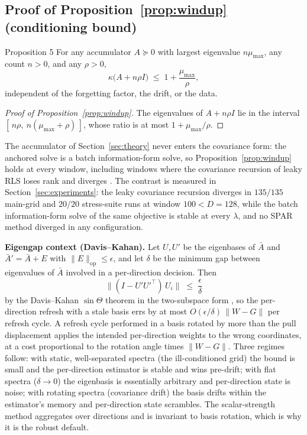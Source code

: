 \subsection{Proof of Proposition~\ref{prop:windup} (conditioning bound)}
\label{app:proof-props}

\begin{restated}{Proposition 5}
For any accumulator $A \succeq 0$ with largest eigenvalue $n\mu_{\max}$, any count $n > 0$, and any $\rho > 0$,
\[
  \kappa\bigl(A + n\rho I\bigr) \;\le\; 1 + \frac{\mu_{\max}}{\rho},
\]
independent of the forgetting factor, the drift, or the data.
\end{restated}

\begin{proof}[Proof of Proposition~\ref{prop:windup}]
The eigenvalues of $A + n\rho I$ lie in the interval $[\,n\rho,\ n(\mu_{\max} + \rho)\,]$, whose ratio is at most $1 + \mu_{\max}/\rho$.
\end{proof}

The accumulator of Section~\ref{sec:theory} never enters the covariance form: the anchored solve is a batch information-form solve, so Proposition~\ref{prop:windup} holds at every window, including windows where the covariance recursion of leaky RLS loses rank and diverges \citep{sayed2008}.
The contrast is measured in Section~\ref{sec:experiments}: the leaky covariance recursion diverges in $135/135$ main-grid and $20/20$ stress-suite runs at window $100 < D = 128$, while the batch information-form solve of the same objective is stable at every $\lambda$, and no SPAR method diverged in any configuration.

\medskip
\noindent\textbf{Eigengap context (Davis--Kahan).}
Let $U, U'$ be the eigenbases of $\bar A$ and $\bar A' = \bar A + E$ with $\|E\|_{\mathrm{op}} \le \epsilon$, and let $\delta$ be the minimum gap between eigenvalues of $\bar A$ involved in a per-direction decision.
Then
\[
  \bigl\|(I - U'U'^\top)\,U_i\bigr\| \;\le\; \frac{\epsilon}{\delta}
\]
by the Davis--Kahan $\sin\Theta$ theorem in the two-subspace form \citep{davis1970,wedin1972}, so the per-direction refresh with a stale basis errs by at most $O(\epsilon/\delta)\,\|W - G\|$ per refresh cycle.
A refresh cycle performed in a basis rotated by more than the pull displacement applies the intended per-direction weights to the wrong coordinates, at a cost proportional to the rotation angle times $\|W - G\|$.
Three regimes follow: with static, well-separated spectra (the ill-conditioned grid) the bound is small and the per-direction estimator is stable and wins pre-drift; with flat spectra ($\delta \to 0$) the eigenbasis is essentially arbitrary and per-direction state is noise; with rotating spectra (covariance drift) the basis drifts within the estimator's memory and per-direction state scrambles.
The scalar-strength method aggregates over directions and is invariant to basis rotation, which is why it is the robust default.

